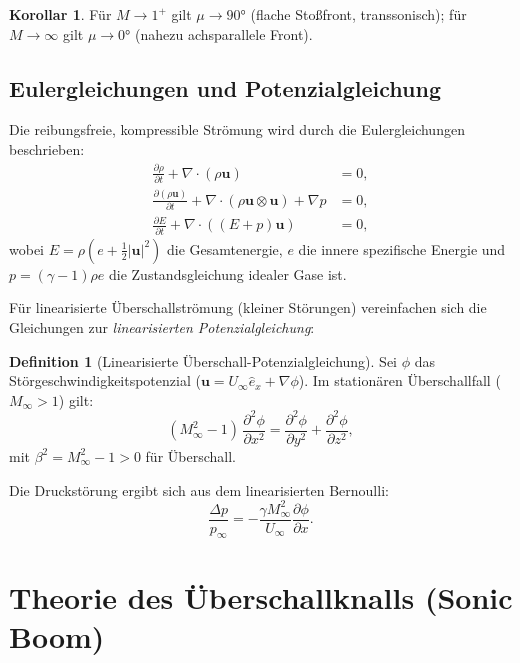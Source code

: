 ﻿\documentclass[12pt,a4paper]{article}
\theoremstyle{definition}
\newtheorem{definition}{Definition}[section]
\newtheorem{korollar}{Korollar}[section]
\theoremstyle{remark}
\newcommand{\pdd}[2]{\frac{\partial #1}{\partial #2}}
\begin{document}
\begin{korollar}
  Für $M \to 1^+$ gilt $\mu \to 90 °$ (flache Stoßfront, transsonisch);
  für $M \to \infty$ gilt $\mu \to 0 °$ (nahezu achsparallele Front).
\end{korollar}

\subsection{Eulergleichungen und Potenzialgleichung}

Die reibungsfreie, kompressible Strömung wird durch die Eulergleichungen beschrieben:
\begin{align}
  \pdd{\rho}{t} + \nabla \cdot (\rho \mathbf{u}) &= 0, \label{eq:kontinuität}\\
  \pdd{(\rho \mathbf{u})}{t} + \nabla \cdot (\rho \mathbf{u} \otimes \mathbf{u}) + \nabla p &= 0, \label{eq:impuls}\\
  \pdd{E}{t} + \nabla \cdot ((E + p)\mathbf{u}) &= 0, \label{eq:energie}
\end{align}
wobei $E = \rho(e + \tfrac{1}{2}|\mathbf{u}|^2)$ die Gesamtenergie, $e$ die innere
spezifische Energie und $p = (\gamma - 1)\rho e$ die Zustandsgleichung idealer Gase ist.

Für linearisierte Überschallströmung (kleiner Störungen) vereinfachen sich die Gleichungen
zur \emph{linearisierten Potenzialgleichung}:

\begin{definition}[Linearisierte Überschall-Potenzialgleichung]
  Sei $\phi$ das Störgeschwindigkeitspotenzial ($\mathbf{u} = U_\infty \hat{e}_x + \nabla\phi$).
  Im stationären Überschallfall ($M_\infty > 1$) gilt:
  \begin{equation}
    (M_\infty^2 - 1)\, \pdd{^2\phi}{x^2} = \pdd{^2\phi}{y^2} + \pdd{^2\phi}{z^2},
    \label{eq:potential}
  \end{equation}
  mit $\beta^2 = M_\infty^2 - 1 > 0$ für Überschall.
\end{definition}

Die Druckstörung ergibt sich aus dem linearisierten Bernoulli:
\begin{equation}
  \frac{\Delta p}{p_\infty} = -\frac{\gamma M_\infty^2}{U_\infty} \pdd{\phi}{x}.
  \label{eq:druck_stoerung}
\end{equation}

\section{Theorie des Überschallknalls (Sonic Boom)}
\label{sec:sonicboom}
\end{document}
